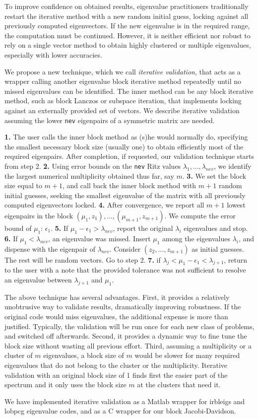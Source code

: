 \documentclass{report}
\begin{document}
To improve confidence on obtained results, eigenvalue practitioners
traditionally restart the iterative method with a new random initial guess,
locking against all previously computed eigenvectors.
If the new eigenvalue is in the required range, the computation
must be continued.
However, it is neither efficient nor robust to rely on a single
vector method to obtain highly clustered or multiple eigenvalues, especially
with lower accuracies.

We propose a new technique, which we call {\it iterative validation},
that acts as a wrapper calling another eigenvalue block iterative method
repeatedly until no missed eigenvalues can be identified.
The inner method can be any block iterative method, such as
block Lanczos or subspace iteration, that implements locking against
an externally provided set of vectors.
We describe iterative validation assuming the lower {\tt nev}
eigenpairs of a symmetric matrix are needed.

{\bf 1.}
The user calls the inner block method as (s)he would normally do,
specifying the smallest necessary block size (usually one) to obtain
efficiently most of the required eigenpairs.
After completion, if requested,
our validation technique starts from step 2.
{\bf 2.}
Using error bounds on the {\tt nev} Ritz values
$\lambda_1, \ldots , \lambda_{nev}$, we identify the largest
numerical multiplicity obtained thus far, say $m$.
{\bf 3.}
We set the block size equal to $m+1$, and call back the inner
block method with $m+1$ random initial guesses,
seeking the smallest eigenvalue of the matrix with
all previously computed eigenvectors locked.
{\bf 4.}
After convergence, we report all $m+1$ lowest eigenpairs in the block
$(\mu_1, z_1), \ldots , (\mu_{m+1}, z_{m+1})$.
We compute the error bound of $\mu_1$: $\epsilon_1$.
{\bf 5.}
If $\mu_1 - \epsilon_1 > \lambda_{nev}$, report the original $\lambda_i$
eigenvalues and stop.
{\bf 6.}
If $\mu_1 < \lambda_{nev}$, an eigenvalue was missed.
Insert $\mu_1$ among the eigenvalues $\lambda_i$,
and dispense with the eigenpair of $\lambda_{nev}$.
Consider $(z_2, \ldots , z_{m+1})$ as initial guesses. The rest
will be random vectors.
Go to step 2.
{\bf 7.}
if $\lambda_j < \mu_1 - \epsilon_1 < \lambda_{j+1}$, return to the
user with a note that the provided tolerance
was not sufficient to resolve an eigenvalue between $\lambda_{j+1}$
and $\mu_1$.

The above technique has several advantages.
First, it provides a relatively unobtrusive way to
validate results, dramatically improving robustness.
If the original code would miss eigenvalues,
the additional expense is more than justified.
Typically, the validation will be run once for each new class of
problems, and switched off afterwards.
Second, it provides a dynamic way to fine tune the block size without
wasting all previous effort.
Third, assuming a multiplicity or a cluster of $m$ eigenvalues,
a block size of $m$ would be slower for many
required eigenvalues that do not belong to the cluster or
the multiplicity.
Iterative validation with an original block size of 1 finds first
the easier part of the spectrum and it only uses the block size
$m$ at the clusters that need it.

We have implemented iterative validation as a Matlab wrapper for
\mbox{irbleigs} and \mbox{lobpcg} eigenvalue codes, and as a C
wrapper for our block Jacobi-Davidson.
\end{document}
